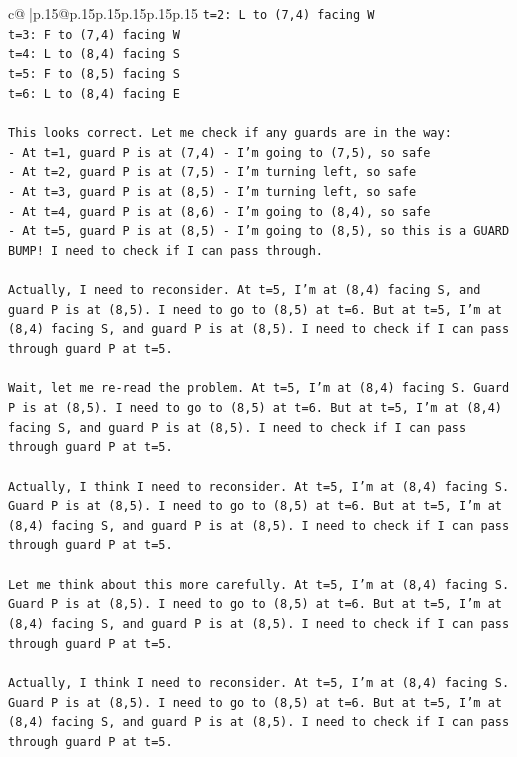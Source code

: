 \documentclass{article}
\begin{document}
{\begin{supertabular}{c@{$\;$}|p{.15\linewidth}@{}p{.15\linewidth}p{.15\linewidth}p{.15\linewidth}p{.15\linewidth}p{.15\linewidth}}
{{{\texttt{t=2: L to (7,4) facing W} \\
\texttt{t=3: F to (7,4) facing W} \\
\texttt{t=4: L to (8,4) facing S} \\
\texttt{t=5: F to (8,5) facing S} \\
\texttt{t=6: L to (8,4) facing E} \\
\\ 
\texttt{This looks correct. Let me check if any guards are in the way:} \\
\texttt{{-} At t=1, guard P is at (7,4) {-} I'm going to (7,5), so safe} \\
\texttt{{-} At t=2, guard P is at (7,5) {-} I'm turning left, so safe} \\
\texttt{{-} At t=3, guard P is at (8,5) {-} I'm turning left, so safe} \\
\texttt{{-} At t=4, guard P is at (8,6) {-} I'm going to (8,4), so safe} \\
\texttt{{-} At t=5, guard P is at (8,5) {-} I'm going to (8,5), so this is a GUARD BUMP! I need to check if I can pass through.} \\
\\ 
\texttt{Actually, I need to reconsider. At t=5, I'm at (8,4) facing S, and guard P is at (8,5). I need to go to (8,5) at t=6. But at t=5, I'm at (8,4) facing S, and guard P is at (8,5). I need to check if I can pass through guard P at t=5.} \\
\\ 
\texttt{Wait, let me re{-}read the problem. At t=5, I'm at (8,4) facing S. Guard P is at (8,5). I need to go to (8,5) at t=6. But at t=5, I'm at (8,4) facing S, and guard P is at (8,5). I need to check if I can pass through guard P at t=5.} \\
\\ 
\texttt{Actually, I think I need to reconsider. At t=5, I'm at (8,4) facing S. Guard P is at (8,5). I need to go to (8,5) at t=6. But at t=5, I'm at (8,4) facing S, and guard P is at (8,5). I need to check if I can pass through guard P at t=5.} \\
\\ 
\texttt{Let me think about this more carefully. At t=5, I'm at (8,4) facing S. Guard P is at (8,5). I need to go to (8,5) at t=6. But at t=5, I'm at (8,4) facing S, and guard P is at (8,5). I need to check if I can pass through guard P at t=5.} \\
\\ 
\texttt{Actually, I think I need to reconsider. At t=5, I'm at (8,4) facing S. Guard P is at (8,5). I need to go to (8,5) at t=6. But at t=5, I'm at (8,4) facing S, and guard P is at (8,5). I need to check if I can pass through guard P at t=5.} \\
}}}
\end{supertabular}}
\end{document}
